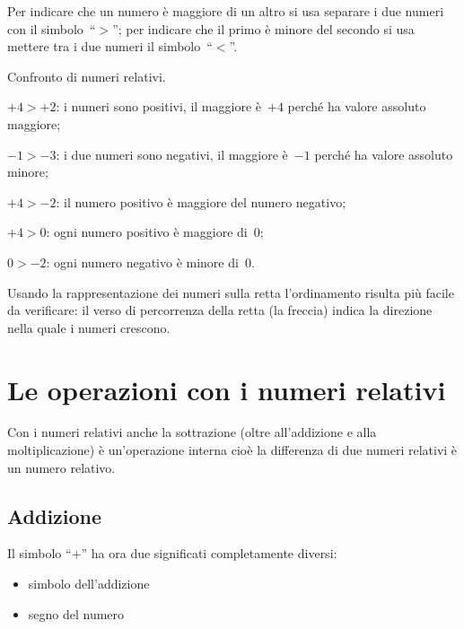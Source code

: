 Per indicare che un numero è maggiore di un altro si usa separare i due 
numeri 
con il
simbolo~``\(>\)''; per indicare che il primo è minore del secondo si usa 
mettere 
tra i due numeri il simbolo~``\(<\)''.

 \begin{esempio}{}{}
 Confronto di numeri relativi.
 \begin{itemize*}
 \item \(+4>+2\): i numeri sono positivi, il maggiore è~\(+4\) perché ha 
valore 
assoluto maggiore;
 \item \(-1>-3\): i due numeri sono negativi, il maggiore è~\(-1\) perché 
ha valore 
assoluto minore;
 \item \(+4>-2\): il numero positivo è maggiore del numero negativo;
 \item \(+4>0\): ogni numero positivo è maggiore di~0;
 \item \(0>-2\): ogni numero negativo è minore di~0.
 \end{itemize*}
 \end{esempio}

Usando la rappresentazione dei numeri sulla retta l'ordinamento risulta più 
facile da verificare:
il verso di percorrenza della retta (la freccia) indica la direzione nella 
quale 
i numeri crescono.


\section{Le operazioni con i numeri relativi}
\label{sec:int_operazioni}

Con i numeri relativi anche la sottrazione (oltre all'addizione e alla 
moltiplicazione) è un'operazione interna cioè la differenza di due numeri 
relativi è un numero relativo.

\subsection{Addizione}

Il simbolo ``\(+\)'' ha ora due significati completamente diversi:
\begin{multicols}{2}
\begin{itemize} [nosep]
\item simbolo dell'addizione
\item segno del numero
\end{itemize}
\end{multicols}

